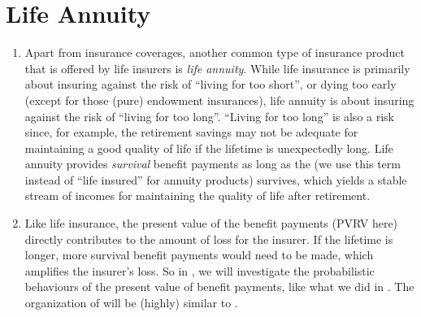 \section{Life Annuity}
\label{sect:life-annuity}
\begin{enumerate}
\item Apart from insurance coverages, another common type of insurance product
that is offered by life insurers is \emph{life annuity}.  While life insurance
is primarily about insuring against the risk of ``living for too short'', or
dying  too early (except for those (pure) endowment
insurances), life annuity is about insuring against the risk of ``living for
too long''. ``Living for too long'' is also a risk since, for example, the
retirement savings may not be adequate for maintaining a good quality of life
if the lifetime is unexpectedly long. Life annuity provides \emph{survival}
benefit payments as long as the  (we use this term instead of
``life insured'' for annuity products) survives, which yields a stable stream
of incomes for maintaining the quality of life after retirement.

\item Like life insurance, the present value of the benefit payments (PVRV
here) directly contributes to the amount of loss for the insurer. If the lifetime
is longer, more survival benefit payments would need to be made, which
amplifies the insurer's loss. So in , we will
investigate the probabilistic behaviours of the present value of benefit
payments, like what we did in . The organization of
 will be (highly) similar to
.
\end{enumerate}

